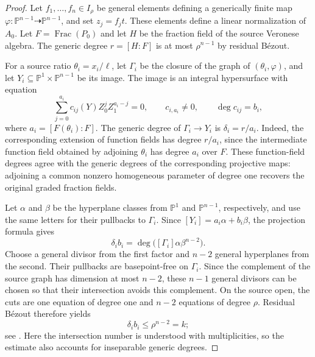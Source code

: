\documentclass[12pt]{amsart}
\numberwithin{equation}{section}
\theoremstyle{definition}
\theoremstyle{remark}
\numberwithin{equation}{section}
\DeclareMathOperator{\Frac}{Frac}
\begin{document}
\begin{proof}
Let $f_1,\ldots,f_n\in I_\rho$  be general elements defining a generically finite map $\varphi:\mathbb P^{n-1}\dashrightarrow\mathbb P^{n-1}$,
and set $z_j=f_jt$. These elements  define  a linear normalization of  $A_0$. Let $F=\Frac(P_0)$ and let $H$ be the fraction field of the
source Veronese algebra. The generic degree $r=[H:F]$ is at most $\rho^{n-1}$ by residual B\'ezout.
	
For a source ratio $\theta_i=x_i/\ell$, let $\Gamma_i$ be the closure of the graph of $(\theta_i,\varphi)$, and let
$Y_i\subseteq\mathbb P^1\times\mathbb P^{n-1}$ be its image. The image is an integral hypersurface with equation
\[
\sum_{j=0}^{a_i}c_{ij}(Y)Z_0^jZ_1^{a_i-j}=0,
\qquad c_{i,a_i}\ne0,\qquad \deg c_{ij}=b_i,
\]
where $a_i=[F(\theta_i):F]$. The generic degree of $\Gamma_i\to Y_i$ is   $\delta_i=r/a_i$. Indeed, the corresponding
	extension of function fields has degree $r/a_i$, since the 	intermediate function field obtained by adjoining $\theta_i$
	has degree $a_i$ over $F$. These function-field degrees agree 	with the generic degrees of the corresponding projective maps:
	adjoining a common nonzero homogeneous parameter of degree one 	recovers the original graded fraction fields.

Let $\alpha$ and $\beta$ be the hyperplane classes from $\mathbb P^1$ and $\mathbb P^{n-1}$, respectively, and use the same
letters for their pullbacks to $\Gamma_i$. Since $[Y_i]=a_i\alpha+b_i\beta$, the projection formula gives
\[
\delta_i b_i=\deg\bigl([\Gamma_i]\alpha\beta^{n-2}\bigr).
\]
Choose a general divisor from the first factor and $n-2$ general hyperplanes from the second. Their pullbacks are basepoint-free
on $\Gamma_i$. Since the complement of the source graph has dimension at most $n-2$, these $n-1$ general divisors
	can be chosen so that their intersection avoids this complement. On the source open, the cuts are one equation of degree one and
$n-2$ equations of degree $\rho$. Residual Bézout therefore yields
\[
\delta_i b_i\le\rho^{n-2}=k;
\]
see \cite[Sections~1.4, 2.3 and Theorem~12.3]{Fulton}.
Here the intersection number is understood with multiplicities, so the estimate also accounts for inseparable generic degrees.


\end{proof}
\end{document}

